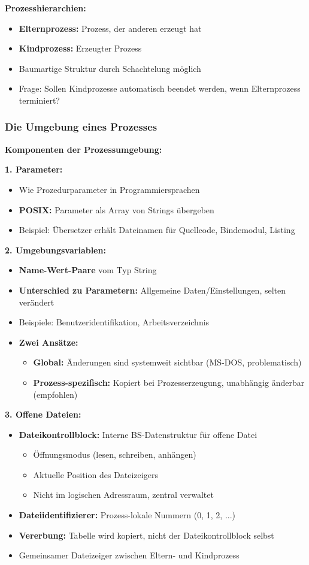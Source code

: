 \documentclass[9pt,a4paper]{extarticle}
\begin{document}
\begin{multicols*}{2}
\textbf{Prozesshierarchien:}
\begin{itemize}
\item \textbf{Elternprozess:} Prozess, der anderen erzeugt hat
\item \textbf{Kindprozess:} Erzeugter Prozess
\item Baumartige Struktur durch Schachtelung möglich
\item Frage: Sollen Kindprozesse automatisch beendet werden, wenn Elternprozess terminiert?
\end{itemize}

\subsubsection{Die Umgebung eines Prozesses}
\textbf{Komponenten der Prozessumgebung:}

\textbf{1. Parameter:}
\begin{itemize}
\item Wie Prozedurparameter in Programmiersprachen
\item \textbf{POSIX:} Parameter als Array von Strings übergeben
\item Beispiel: Übersetzer erhält Dateinamen für Quellcode, Bindemodul, Listing
\end{itemize}

\textbf{2. Umgebungsvariablen:}
\begin{itemize}
\item \textbf{Name-Wert-Paare} vom Typ String
\item \textbf{Unterschied zu Parametern:} Allgemeine Daten/Einstellungen, selten verändert
\item Beispiele: Benutzeridentifikation, Arbeitsverzeichnis
\item \textbf{Zwei Ansätze:}
  \begin{itemize}
  \item \textbf{Global:} Änderungen sind systemweit sichtbar (MS-DOS, problematisch)
  \item \textbf{Prozess-spezifisch:} Kopiert bei Prozesserzeugung, unabhängig änderbar (empfohlen)
  \end{itemize}
\end{itemize}

\textbf{3. Offene Dateien:}
\begin{itemize}
\item \textbf{Dateikontrollblock:} Interne BS-Datenstruktur für offene Datei
  \begin{itemize}
  \item Öffnungsmodus (lesen, schreiben, anhängen)
  \item Aktuelle Position des Dateizeigers
  \item Nicht im logischen Adressraum, zentral verwaltet
  \end{itemize}
\item \textbf{Dateiidentifizierer:} Prozess-lokale Nummern (0, 1, 2, ...)
\item \textbf{Vererbung:} Tabelle wird kopiert, nicht der Dateikontrollblock selbst
\item Gemeinsamer Dateizeiger zwischen Eltern- und Kindprozess
\end{itemize}


\end{multicols*}
\end{document}

